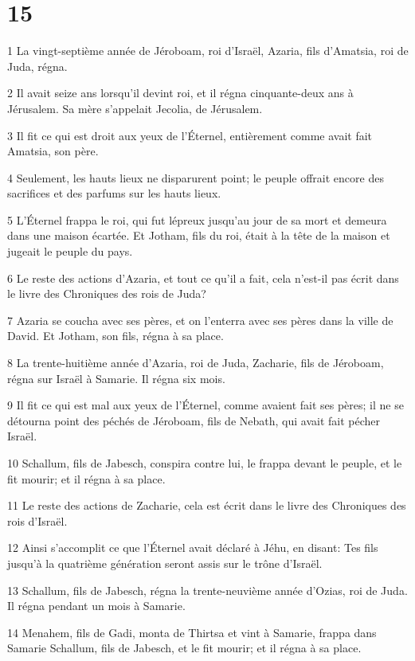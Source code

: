 \chapter{15}

\par 1 La vingt-septième année de Jéroboam, roi d'Israël, Azaria, fils d'Amatsia, roi de Juda, régna.
\par 2 Il avait seize ans lorsqu'il devint roi, et il régna cinquante-deux ans à Jérusalem. Sa mère s'appelait Jecolia, de Jérusalem.
\par 3 Il fit ce qui est droit aux yeux de l'Éternel, entièrement comme avait fait Amatsia, son père.
\par 4 Seulement, les hauts lieux ne disparurent point; le peuple offrait encore des sacrifices et des parfums sur les hauts lieux.
\par 5 L'Éternel frappa le roi, qui fut lépreux jusqu'au jour de sa mort et demeura dans une maison écartée. Et Jotham, fils du roi, était à la tête de la maison et jugeait le peuple du pays.
\par 6 Le reste des actions d'Azaria, et tout ce qu'il a fait, cela n'est-il pas écrit dans le livre des Chroniques des rois de Juda?
\par 7 Azaria se coucha avec ses pères, et on l'enterra avec ses pères dans la ville de David. Et Jotham, son fils, régna à sa place.
\par 8 La trente-huitième année d'Azaria, roi de Juda, Zacharie, fils de Jéroboam, régna sur Israël à Samarie. Il régna six mois.
\par 9 Il fit ce qui est mal aux yeux de l'Éternel, comme avaient fait ses pères; il ne se détourna point des péchés de Jéroboam, fils de Nebath, qui avait fait pécher Israël.
\par 10 Schallum, fils de Jabesch, conspira contre lui, le frappa devant le peuple, et le fit mourir; et il régna à sa place.
\par 11 Le reste des actions de Zacharie, cela est écrit dans le livre des Chroniques des rois d'Israël.
\par 12 Ainsi s'accomplit ce que l'Éternel avait déclaré à Jéhu, en disant: Tes fils jusqu'à la quatrième génération seront assis sur le trône d'Israël.
\par 13 Schallum, fils de Jabesch, régna la trente-neuvième année d'Ozias, roi de Juda. Il régna pendant un mois à Samarie.
\par 14 Menahem, fils de Gadi, monta de Thirtsa et vint à Samarie, frappa dans Samarie Schallum, fils de Jabesch, et le fit mourir; et il régna à sa place.
